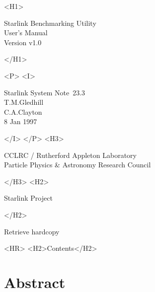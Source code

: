 \documentclass[11pt]{article}
\newcommand{\stardoccategory}  {Starlink System Note}
\newcommand{\stardocsource}    {ssn\stardocnumber}
\newcommand{\stardocnumber}    {23.3}
\newcommand{\stardocauthors}   {T.M.Gledhill \\
                                C.A.Clayton}
\newcommand{\stardocdate}      {8 Jan 1997}
\newcommand{\stardoctitle}     {Starlink Benchmarking Utility}
\newcommand{\stardocversion}   {Version \pkgver}
\newcommand{\stardocmanual}    {User's Manual}
\newcommand{\htmladdnormallink}[2]{#1}
\newcommand{\htmladdimg}[1]{}
\newcommand{\htmlref}[2]{#1}
\newcommand{\htmladdtonavigation}[1]{}
\newcommand{\xlabel}[1]{}
\newcommand{\pkgver}     {v1.0}
\begin{document}
\begin{htmlonly}
   \xlabel{}
   \begin{rawhtml} <H1> \end{rawhtml}
      \stardoctitle\\
      \stardocmanual\\
      \stardocversion
   \begin{rawhtml} </H1> \end{rawhtml}


   \begin{rawhtml} <P> <I> \end{rawhtml}
   \stardoccategory\ \stardocnumber \\
   \stardocauthors \\
   \stardocdate
   \begin{rawhtml} </I> </P> <H3> \end{rawhtml}
      \htmladdnormallink{CCLRC}{http://www.cclrc.ac.uk} /
      \htmladdnormallink{Rutherford Appleton Laboratory}
                        {http://www.cclrc.ac.uk/ral} \\
      \htmladdnormallink{Particle Physics \& Astronomy Research Council}
                        {http://www.pparc.ac.uk} \\
   \begin{rawhtml} </H3> <H2> \end{rawhtml}
      \htmladdnormallink{Starlink Project}{http://www.starlink.ac.uk/}
   \begin{rawhtml} </H2> \end{rawhtml}
   \htmladdnormallink{\htmladdimg{source.gif} Retrieve hardcopy}
      {http://www.starlink.ac.uk/cgi-bin/hcserver?\stardocsource}\\

  \label{stardoccontents}
  \begin{rawhtml} 
    <HR>
    <H2>Contents</H2>
  \end{rawhtml}
  \htmladdtonavigation{\htmlref{\htmladdimg{contents_motif.gif}}
        {stardoccontents}}

  \section{\xlabel{abstract}Abstract}

\end{htmlonly}
\end{document}
